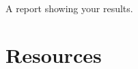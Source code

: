 A report showing your results.

\section{Resources}



\begin{comment}

  The Figure~\ref{fig:transform_coding} shows the stages that are
  tipycally involved in a transform-based signal compression system.

\begin{figure}
  \begin{center}
\begin{verbatim}
   s   +---+   w    +---+   k    +---+    c
 ----->| T |------->| Q |------->| E |-----------+
  (s)  +---+  (s)   +---+  (~s)  +---+   (~s)    |
samples   coefficients   indexes      code-words ~
                                                 :
                                                 ~
   ~s  +---+    w   +---+   k    +---+           |
 <-----| t |<-------| q |<-------| D |<----------+
  (~s) +---+  (~s)  +---+  (~s)  +---+
approx.    quantized     indexes
samples   coefficients
\end{verbatim}                
  \end{center}
  \caption{Common data-flow used un Transform Coding. $s$ represents
    the signal to compress, $\tilde{s}$ the lossy version of the
    reconstructed signal, $T$ the (forward) transform (which takes blocks of
    samples) producing blocks of coefficients $w$, $Q$ the scalar
    quantization stage (which takes single coefficients) producing
    quantization indexes $k$, $E$ the entropy encoder (which in our
    case (DEFLATE) works with blocks of coefficients) producing
    code-words $c$, $D$ the entropy decoder, $q$ the decuantization
    stage, and $t$ the inverse (or backward) transform. PCM stands for Puse Code
    Modulation and DEFLATE is the technique used to find a compact
    representation of the quantized coefficients.}
  \label{fig:transform_coding}
\end{figure}
\end{comment}

